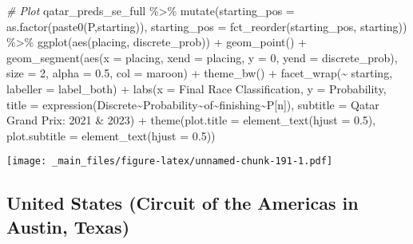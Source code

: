 \documentclass[
]{book}
\newenvironment{Shaded}{\begin{snugshade}}{\end{snugshade}}
\newcommand{\AttributeTok}[1]{\textcolor[rgb]{0.77,0.63,0.00}{#1}}
\newcommand{\CommentTok}[1]{\textcolor[rgb]{0.56,0.35,0.01}{\textit{#1}}}
\newcommand{\DecValTok}[1]{\textcolor[rgb]{0.00,0.00,0.81}{#1}}
\newcommand{\FloatTok}[1]{\textcolor[rgb]{0.00,0.00,0.81}{#1}}
\newcommand{\FunctionTok}[1]{\textcolor[rgb]{0.00,0.00,0.00}{#1}}
\newcommand{\NormalTok}[1]{#1}
\newcommand{\SpecialCharTok}[1]{\textcolor[rgb]{0.00,0.00,0.00}{#1}}
\newcommand{\StringTok}[1]{\textcolor[rgb]{0.31,0.60,0.02}{#1}}
\begin{document}
\begin{Shaded}
\begin{Highlighting}[]
\CommentTok{\# Plot}
\NormalTok{qatar\_preds\_se\_full }\SpecialCharTok{\%\textgreater{}\%}
  \FunctionTok{mutate}\NormalTok{(}\AttributeTok{starting\_pos =} \FunctionTok{as.factor}\NormalTok{(}\FunctionTok{paste0}\NormalTok{(}\StringTok{\textquotesingle{}P\textquotesingle{}}\NormalTok{,starting)),}
         \AttributeTok{starting\_pos =} \FunctionTok{fct\_reorder}\NormalTok{(starting\_pos, starting)) }\SpecialCharTok{\%\textgreater{}\%}
  \FunctionTok{ggplot}\NormalTok{(}\FunctionTok{aes}\NormalTok{(placing, discrete\_prob)) }\SpecialCharTok{+}
  \FunctionTok{geom\_point}\NormalTok{() }\SpecialCharTok{+}
  \FunctionTok{geom\_segment}\NormalTok{(}\FunctionTok{aes}\NormalTok{(}\AttributeTok{x =}\NormalTok{ placing, }\AttributeTok{xend =}\NormalTok{ placing, }\AttributeTok{y =} \DecValTok{0}\NormalTok{, }\AttributeTok{yend =}\NormalTok{ discrete\_prob),}
               \AttributeTok{size =} \DecValTok{2}\NormalTok{, }\AttributeTok{alpha =} \FloatTok{0.5}\NormalTok{, }\AttributeTok{col =} \StringTok{\textquotesingle{}maroon\textquotesingle{}}\NormalTok{) }\SpecialCharTok{+}
  \FunctionTok{theme\_bw}\NormalTok{() }\SpecialCharTok{+}
  \FunctionTok{facet\_wrap}\NormalTok{(}\SpecialCharTok{\textasciitilde{}}\NormalTok{ starting, }\AttributeTok{labeller =}\NormalTok{ label\_both) }\SpecialCharTok{+}
  \FunctionTok{labs}\NormalTok{(}\AttributeTok{x =} \StringTok{\textquotesingle{}Final Race Classification\textquotesingle{}}\NormalTok{,}
       \AttributeTok{y =} \StringTok{\textquotesingle{}Probability\textquotesingle{}}\NormalTok{,}
       \AttributeTok{title =} \FunctionTok{expression}\NormalTok{(Discrete}\SpecialCharTok{\textasciitilde{}}\NormalTok{Probability}\SpecialCharTok{\textasciitilde{}}\NormalTok{of}\SpecialCharTok{\textasciitilde{}}\NormalTok{finishing}\SpecialCharTok{\textasciitilde{}}\NormalTok{P[n]),}
       \AttributeTok{subtitle =} \StringTok{\textquotesingle{}Qatar Grand Prix: 2021 \& 2023\textquotesingle{}}\NormalTok{) }\SpecialCharTok{+}
  \FunctionTok{theme}\NormalTok{(}\AttributeTok{plot.title =} \FunctionTok{element\_text}\NormalTok{(}\AttributeTok{hjust =} \FloatTok{0.5}\NormalTok{),}
        \AttributeTok{plot.subtitle =} \FunctionTok{element\_text}\NormalTok{(}\AttributeTok{hjust =} \FloatTok{0.5}\NormalTok{)) }
\end{Highlighting}
\end{Shaded}

\texttt{[image: \_main\_files/figure-latex/unnamed-chunk-191-1.pdf]}

\hypertarget{united-states-circuit-of-the-americas-in-austin-texas}{%
\subsection{United States (Circuit of the Americas in Austin, Texas)}\label{united-states-circuit-of-the-americas-in-austin-texas}}
\end{document}
